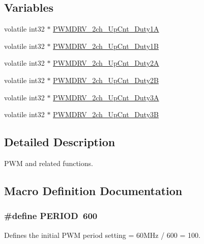 \subsection*{Variables}
\begin{DoxyCompactItemize}
\item 
volatile int32 $\ast$ \hyperlink{a00026_a8a02650c6afb411447157faf0e90a7b2}{P\-W\-M\-D\-R\-V\-\_\-2ch\-\_\-\-Up\-Cnt\-\_\-\-Duty1\-A}
\item 
volatile int32 $\ast$ \hyperlink{a00026_a23767edc2ebfabc9336684185a4f2d84}{P\-W\-M\-D\-R\-V\-\_\-2ch\-\_\-\-Up\-Cnt\-\_\-\-Duty1\-B}
\item 
volatile int32 $\ast$ \hyperlink{a00026_acc76d5ffc745e63de05baa242bb3d16f}{P\-W\-M\-D\-R\-V\-\_\-2ch\-\_\-\-Up\-Cnt\-\_\-\-Duty2\-A}
\item 
volatile int32 $\ast$ \hyperlink{a00026_a3215b15b28994e0840d64200f09cbfb0}{P\-W\-M\-D\-R\-V\-\_\-2ch\-\_\-\-Up\-Cnt\-\_\-\-Duty2\-B}
\item 
volatile int32 $\ast$ \hyperlink{a00026_a86962b3c7a5a851d9ddce3301a9db727}{P\-W\-M\-D\-R\-V\-\_\-2ch\-\_\-\-Up\-Cnt\-\_\-\-Duty3\-A}
\item 
volatile int32 $\ast$ \hyperlink{a00026_a9550c95286e784256c9f12906ff5a407}{P\-W\-M\-D\-R\-V\-\_\-2ch\-\_\-\-Up\-Cnt\-\_\-\-Duty3\-B}
\end{DoxyCompactItemize}


\subsection{Detailed Description}
P\-W\-M and related functions. 

\subsection{Macro Definition Documentation}
\hypertarget{a00026_af281425e62298bac2df0fbe8690a4844}{
\subsubsection[{P\-E\-R\-I\-O\-D}]{\setlength{\rightskip}{0pt plus 5cm}\#define P\-E\-R\-I\-O\-D~600}}\label{a00026_af281425e62298bac2df0fbe8690a4844}
Defines the initial P\-W\-M period setting = 60\-M\-Hz / 600 = 100. 

